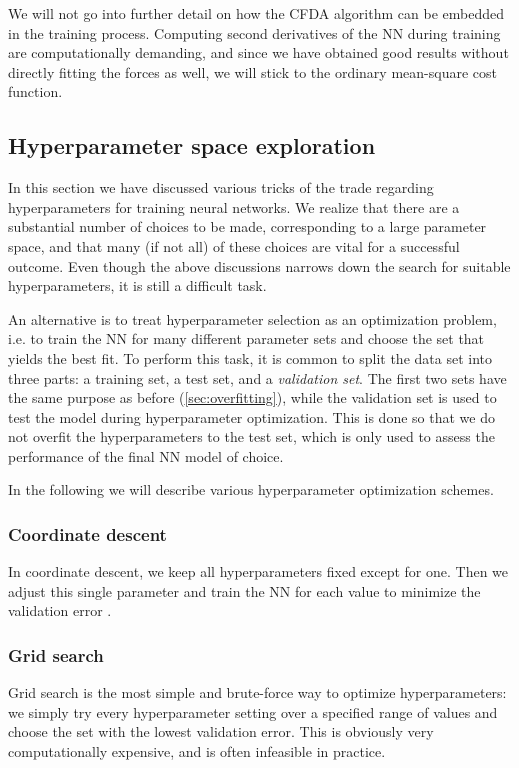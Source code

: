 \documentclass[twoside,english]{uiofysmaster}
\begin{document}
We will not go into further detail on how the CFDA algorithm can be embedded in the training process. 
Computing second derivatives of the NN during training are computationally demanding, and since we have obtained 
good results without directly fitting the forces as well, we will stick to the ordinary mean-square cost function. 



\subsection{Hyperparameter space exploration} \label{sec:optimizingHyperparameters}
In this section we have discussed various tricks of the trade regarding hyperparameters for training neural networks. 
We realize that there are a substantial number of choices to be made, corresponding to a large parameter space, and 
that many (if not all) of these choices are vital for a successful outcome. Even though the above discussions narrows down the search 
for suitable hyperparameters, it is still a difficult task. 

An alternative is to treat hyperparameter selection as an optimization problem, i.e. to train the NN for many different 
parameter sets and choose the set that yields the best fit. To perform this task, it is common to split the data set 
into three parts: a training set, a test set, and a \textit{validation set}. The first two sets have the same 
purpose as before (\autoref{sec:overfitting}), while the validation set is used to test the model during hyperparameter 
optimization. This is done so that we do not overfit the hyperparameters to the test set, which is only used to assess 
the performance of the final NN model of choice.

In the following we will describe various hyperparameter optimization schemes. 

\subsubsection{Coordinate descent}
In coordinate descent, we keep all hyperparameters fixed except for one. Then we adjust this single parameter and train the NN
for each value to minimize the validation error  .

\subsubsection{Grid search}
Grid search is the most simple and brute-force way to optimize hyperparameters: we simply try every hyperparameter setting 
over a specified range of values and choose the set with the lowest validation error. This is obviously very computationally 
expensive, and is often infeasible in practice. 
\end{document}
